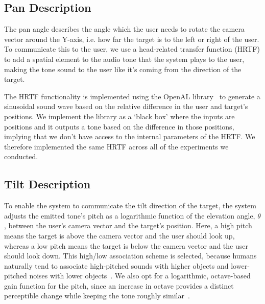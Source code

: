 \documentclass[format=sigconf, review=true, screen=true, anonymous=true]{acmart}
\begin{document}
\subsection{Pan Description}

The pan angle describes the angle which the user needs to rotate the camera vector around the Y-axis, i.e. how far the target is to the left or right of the user. To communicate this to the user, we use a head-related transfer function (HRTF) to add a spatial element to the audio tone that the system plays to the user, making the tone sound to the user like it's coming from the direction of the target. 

The HRTF functionality is implemented using the OpenAL library~\cite{hiebert2005openal} to generate a sinusoidal sound wave based on the relative difference in the user and target's positions. We implement the library as a `black box' where the inputs are positions and it outputs a tone based on the difference in those positions, implying that we don't have access to the internal parameters of the HRTF. We therefore implemented the same HRTF across all of the experiments we conducted.  



\subsection{Tilt Description}

To enable the system to communicate the tilt direction of the target, the system adjusts the emitted tone's pitch as a logarithmic function of the elevation angle, $\theta$, between the user's camera vector and the target's position. Here, a high pitch means the target is above the camera vector and the user should look up, whereas a low pitch means the target is below the camera vector and the user should look down. This high/low association scheme is selected, because humans naturally tend to associate high-pitched sounds with higher objects and lower-pitched noises with lower objects~\cite{pratt1930spatial}. We also opt for a logarithmic, octave-based gain function for the pitch, since an increase in octave provides a distinct perceptible change while keeping the tone roughly similar~\cite{shepard1964circularity}.
\end{document}
